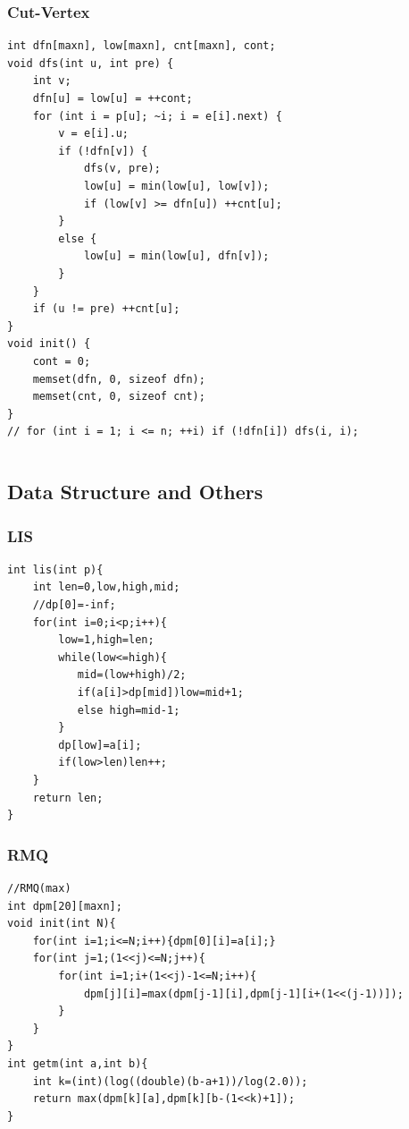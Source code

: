 \documentclass[a4paper]{article}
\begin{document}
\begin{CJK*}{UTF8}{gbsn}
\begin{multicols}{3}
\begin{flushleft}
\subsubsection{Cut-Vertex}
\begin{lstlisting}
int dfn[maxn], low[maxn], cnt[maxn], cont;
void dfs(int u, int pre) {
    int v;
    dfn[u] = low[u] = ++cont;
    for (int i = p[u]; ~i; i = e[i].next) {
        v = e[i].u;
        if (!dfn[v]) {
            dfs(v, pre);
            low[u] = min(low[u], low[v]);
            if (low[v] >= dfn[u]) ++cnt[u];
        }
        else {
            low[u] = min(low[u], dfn[v]);
        }
    }
    if (u != pre) ++cnt[u];
}
void init() {
    cont = 0;
    memset(dfn, 0, sizeof dfn);
    memset(cnt, 0, sizeof cnt);
}
// for (int i = 1; i <= n; ++i) if (!dfn[i]) dfs(i, i);
\end{lstlisting}

\begin{lstlisting}
\end{lstlisting}



\subsection{Data Structure and Others}

\subsubsection{LIS}
\begin{lstlisting}
int lis(int p){
    int len=0,low,high,mid;
    //dp[0]=-inf;
    for(int i=0;i<p;i++){
        low=1,high=len;
        while(low<=high){
           mid=(low+high)/2;
           if(a[i]>dp[mid])low=mid+1;
           else high=mid-1;
        }
        dp[low]=a[i];
        if(low>len)len++;
    }
    return len;
}
\end{lstlisting}

\subsubsection{RMQ}
\begin{lstlisting}
//RMQ(max)
int dpm[20][maxn];
void init(int N){
    for(int i=1;i<=N;i++){dpm[0][i]=a[i];}
    for(int j=1;(1<<j)<=N;j++){
        for(int i=1;i+(1<<j)-1<=N;i++){
            dpm[j][i]=max(dpm[j-1][i],dpm[j-1][i+(1<<(j-1))]);
        }
    }
}
int getm(int a,int b){
    int k=(int)(log((double)(b-a+1))/log(2.0));
    return max(dpm[k][a],dpm[k][b-(1<<k)+1]);
}
\end{lstlisting}


\end{flushleft}
\end{multicols}
\end{CJK*}
\end{document}
